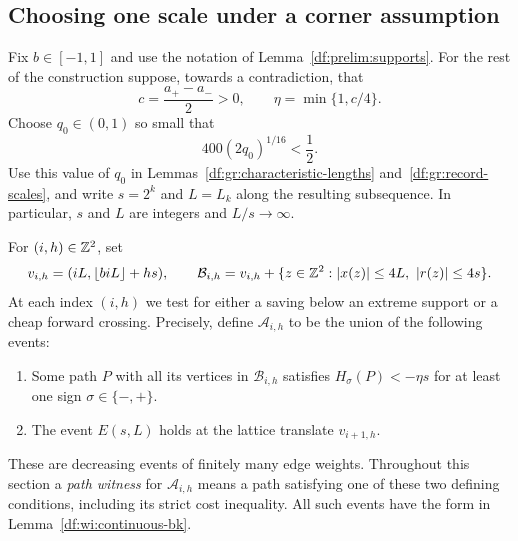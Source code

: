 \subsection{Choosing one scale under a corner assumption}

Fix $b\in[-1,1]$ and use the notation of Lemma~\ref{df:prelim:supports}.
For the rest of the construction suppose, towards a contradiction, that
\[
  c=\frac{a_+-a_-}{2}>0,
  \qquad
  \eta=\min\{1,c/4\}.
\]
Choose $q_0\in(0,1)$ so small that
\begin{equation}
\label{df:wi:q-choice}
  400(2q_0)^{1/16}<\frac12.
\end{equation}
Use this value of $q_0$ in Lemmas~\ref{df:gr:characteristic-lengths}
and~\ref{df:gr:record-scales}, and write $s=2^k$ and $L=L_k$ along the resulting
subsequence.  In particular, $s$ and $L$ are integers and $L/s\to\infty$.

For $(i,h)\in\mathbb Z^2$, set
\[
  v_{i,h}=(iL,\lfloor biL\rfloor+hs),
  \qquad
  \mathcal B_{i,h}
  =v_{i,h}+\{z\in\mathbb Z^2:\left\lvert x(z)\right\rvert\le4L,\ \left\lvert r(z)\right\rvert\le4s\}.
\]
At each index $(i,h)$ we test for either a saving below an extreme support
or a cheap forward crossing. Precisely, define $\mathcal A_{i,h}$ to be
the union of the following events:
\begin{enumerate}
\item Some path $P$ with all its vertices in $\mathcal B_{i,h}$ satisfies
      $H_\sigma(P)<-\eta s$ for at least one sign
      $\sigma\in\{-,+\}$.
\item The event $E(s,L)$ holds at the lattice translate $v_{i+1,h}$.
\end{enumerate}
These are decreasing events of finitely many edge weights.  Throughout this
section a \emph{path witness} for $\mathcal A_{i,h}$ means a path satisfying
one of these two defining conditions, including its strict cost inequality.
All such events have the form in Lemma~\ref{df:wi:continuous-bk}.

